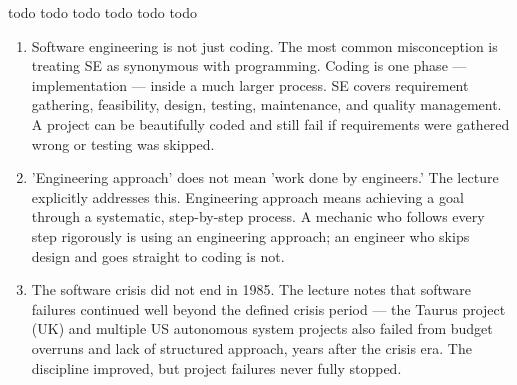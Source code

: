\documentclass{report}
\begin{document}
\sol todo
\sol todo
\sol todo
\sol todo
\sol todo
\sol todo

\begin{miss}
\begin{enumerate}
\item Software engineering is not just coding. The most common misconception is treating SE as synonymous with programming. Coding is one phase — implementation — inside a much larger process. SE covers requirement gathering, feasibility, design, testing, maintenance, and quality management. A project can be beautifully coded and still fail if requirements were gathered wrong or testing was skipped.
\item 'Engineering approach' does not mean 'work done by engineers.' The lecture explicitly addresses this. Engineering approach means achieving a goal through a systematic, step-by-step process. A mechanic who follows every step rigorously is using an engineering approach; an engineer who skips design and goes straight to coding is not.
\item The software crisis did not end in 1985. The lecture notes that software failures continued well beyond the defined crisis period — the Taurus project (UK) and multiple US autonomous system projects also failed from budget overruns and lack of structured approach, years after the crisis era. The discipline improved, but project failures never fully stopped.
\end{enumerate}
\end{miss}
\end{document}
